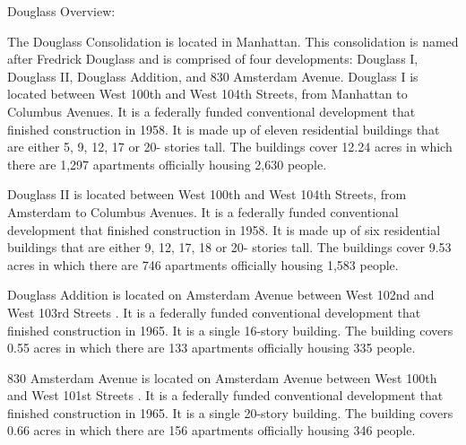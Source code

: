 Douglass Overview:    

  

The Douglass Consolidation is located in Manhattan. This consolidation is named after Fredrick Douglass and is comprised of four developments: Douglass I, Douglass II, Douglass Addition, and 830 Amsterdam Avenue. Douglass I is located between West 100th and West 104th Streets, from Manhattan to Columbus Avenues. It is a federally funded conventional development that finished construction in 1958. It is made up of eleven residential buildings that are either 5, 9, 12, 17 or 20- stories tall. The buildings cover 12.24 acres in which there are 1,297 apartments officially housing 2,630 people.     

Douglass II is located between West 100th and West 104th Streets, from Amsterdam to Columbus Avenues. It is a federally funded conventional development that finished construction in 1958. It is made up of six residential buildings that are either 9, 12, 17, 18 or 20- stories tall. The buildings cover 9.53 acres in which there are 746 apartments officially housing 1,583 people.     

    

Douglass Addition is located on Amsterdam Avenue between West 102nd and West 103rd Streets . It is a federally funded conventional development that finished construction in 1965. It is a single 16-story building. The building covers 0.55 acres in which there are 133 apartments officially housing 335 people.     

 

830 Amsterdam Avenue is located on Amsterdam Avenue between West 100th and West 101st Streets . It is a federally funded conventional development that finished construction in 1965. It is a single 20-story building. The building covers 0.66 acres in which there are 156 apartments officially housing 346 people.     

      

 
